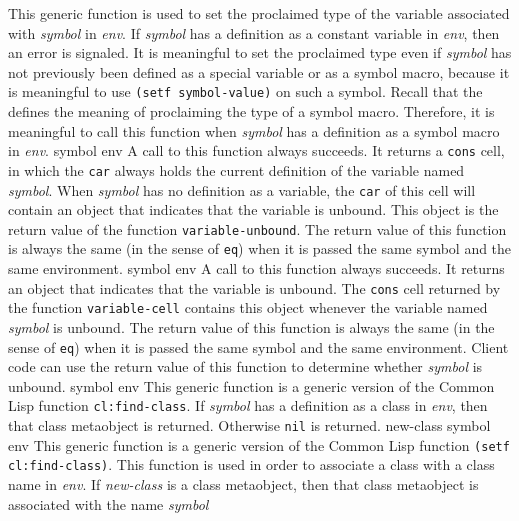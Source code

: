 \vskip -0.2cm
This generic function is used to set the proclaimed type of the
variable associated with \textit{symbol} in \textit{env}.
\vskip -0.02cm
If \textit{symbol} has a definition as a constant variable in \textit{env},
then an error is signaled.
\vskip -0.02cm
It is meaningful to set the proclaimed type even if \textit{symbol}
has not previously been defined as a special variable or as a symbol
macro, because it is meaningful to use \texttt{(setf symbol-value)} on
such a symbol.
\vskip -0.02cm
Recall that the \hs{} defines the meaning of proclaiming the
type of a symbol macro.  Therefore, it is meaningful to call this
function when \textit{symbol} has a definition as a symbol macro in
\textit{env}.
\vskip -0.02cm
 {symbol env}
\vskip -0.2cm
A call to this function always succeeds.  It returns a \texttt{cons}
cell, in which the \texttt{car} always holds the current definition of
the variable named \textit{symbol}.  When \textit{symbol} has no
definition as a variable, the \texttt{car} of this cell will contain
an object that indicates that the variable is unbound.  This object is
the return value of the function \texttt{variable-unbound}.  The
return value of this function is always the same (in the sense
of \texttt{eq}) when it is passed the same symbol and the same
environment.
\vskip -0.02cm
 {symbol env}
\vskip -0.2cm
A call to this function always succeeds.  It returns an object that
indicates that the variable is unbound.  The \texttt{cons} cell
returned by the function \texttt{variable-cell} contains this object
whenever the variable named \textit{symbol} is unbound.  The return
value of this function is always the same (in the sense
of \texttt{eq}) when it is passed the same symbol and the same
environment.  Client code can use the return value of this function to
determine whether
\textit{symbol} is unbound.
\vskip -0.02cm
 {symbol env}
\vskip -0.2cm
This generic function is a generic version of the Common Lisp
function \texttt{cl:find-class}.
\vskip -0.02cm
If \textit{symbol} has a definition as a class in \textit{env}, then that
class metaobject is returned.  Otherwise \texttt{nil} is returned.
\vskip -0.02cm
 {new-class symbol env}
\vskip -0.2cm
This generic function is a generic version of the Common Lisp
function \texttt{(setf cl:find-class)}.
\vskip -0.02cm
This function is used in order to associate a class with a class
name in \textit{env}.
\vskip -0.02cm
If \textit{new-class} is a class metaobject, then that class
metaobject is associated with the name \textit{symbol}
